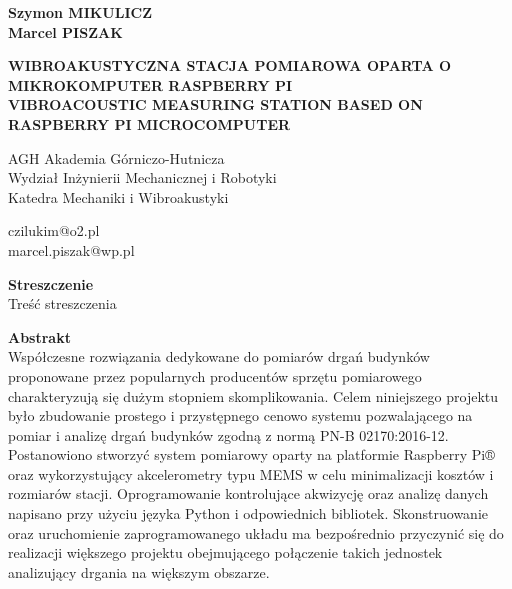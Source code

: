 \documentclass[a4paper,12pt]{mwart}
\begin{document}
\onehalfspacing
\begin{flushleft}

  \textbf{Szymon \MakeUppercase{Mikulicz}} \\
  \textbf{Marcel \MakeUppercase{Piszak}} \\
  \vspace*{12pt}

  \MakeUppercase{\textbf{Wibroakustyczna stacja pomiarowa oparta o mikrokomputer Raspberry Pi}} \\
  \vspace*{6pt}
  \MakeUppercase{\textbf{Vibroacoustic measuring station based on Raspberry Pi microcomputer}} \\
  \vspace*{12pt}

  AGH Akademia Górniczo-Hutnicza \\
  Wydział Inżynierii Mechanicznej i Robotyki \\
  Katedra Mechaniki i Wibroakustyki \\
  \vspace*{6pt}

  czilukim@o2.pl \\
  marcel.piszak@wp.pl \\

\end{flushleft}

\noindent
\textbf{Streszczenie} \\
Treść streszczenia
\vspace*{24pt}

\noindent
\textbf{Abstrakt} \\
Współczesne rozwiązania dedykowane do pomiarów drgań budynków proponowane przez
popularnych producentów sprzętu pomiarowego charakteryzują się dużym stopniem
skomplikowania. Celem niniejszego projektu było zbudowanie prostego i
przystępnego cenowo systemu pozwalającego na pomiar i analizę drgań budynków
zgodną z normą PN-B 02170:2016-12. Postanowiono stworzyć system pomiarowy
oparty na platformie Raspberry Pi® oraz wykorzystujący akcelerometry typu MEMS
w celu minimalizacji kosztów i rozmiarów stacji. Oprogramowanie kontrolujące
akwizycję oraz analizę danych napisano przy użyciu języka Python i odpowiednich
bibliotek. Skonstruowanie oraz uruchomienie zaprogramowanego układu ma
bezpośrednio przyczynić się do realizacji większego projektu obejmującego
połączenie takich jednostek analizujący drgania na większym obszarze.
\vspace*{24pt}
\end{document}
